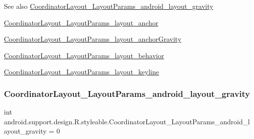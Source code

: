 \begin{DoxySeeAlso}{See also}
\hyperlink{classandroid_1_1support_1_1design_1_1R_1_1styleable_a4f19a966939e4daa90156b8714754325}{Coordinator\+Layout\+\_\+\+Layout\+Params\+\_\+android\+\_\+layout\+\_\+gravity} 

\hyperlink{classandroid_1_1support_1_1design_1_1R_1_1styleable_a2b541addd48569ad627329eb45eb5445}{Coordinator\+Layout\+\_\+\+Layout\+Params\+\_\+layout\+\_\+anchor} 

\hyperlink{classandroid_1_1support_1_1design_1_1R_1_1styleable_a62798f0cfacf5c8b36479c1585a47c87}{Coordinator\+Layout\+\_\+\+Layout\+Params\+\_\+layout\+\_\+anchor\+Gravity} 

\hyperlink{classandroid_1_1support_1_1design_1_1R_1_1styleable_a7080bda2bea789b4e55596a0b650c34e}{Coordinator\+Layout\+\_\+\+Layout\+Params\+\_\+layout\+\_\+behavior} 

\hyperlink{classandroid_1_1support_1_1design_1_1R_1_1styleable_a4261fa2784dbde0962e2046fc2bbfb18}{Coordinator\+Layout\+\_\+\+Layout\+Params\+\_\+layout\+\_\+keyline} 
\end{DoxySeeAlso}
\mbox{\label{classandroid_1_1support_1_1design_1_1R_1_1styleable_a4f19a966939e4daa90156b8714754325}} 
\subsubsection{\texorpdfstring{Coordinator\+Layout\+\_\+\+Layout\+Params\+\_\+android\+\_\+layout\+\_\+gravity}{CoordinatorLayout\_LayoutParams\_android\_layout\_gravity}}
{\footnotesize\ttfamily int android.\+support.\+design.\+R.\+styleable.\+Coordinator\+Layout\+\_\+\+Layout\+Params\+\_\+android\+\_\+layout\+\_\+gravity = 0\hspace{0.3cm}{\ttfamily [static]}}

